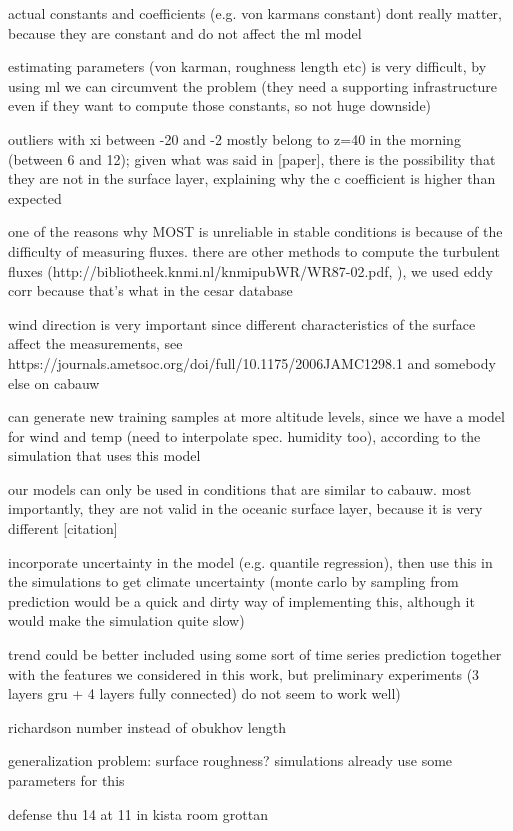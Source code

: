 \documentclass[a4paper]{book}
\begin{document}
actual constants and coefficients (e.g. von karmans constant) dont really matter, because they are constant and do not affect the ml model 

estimating parameters (von karman, roughness length etc) is very difficult, by using ml we can circumvent the problem (they need a supporting infrastructure even if they want to compute those constants, so not huge downside)

outliers with xi between -20 and -2 mostly belong to z=40 in the morning (between 6 and 12); given what was said in [paper], there is the possibility that they are not in the surface layer, explaining why the c coefficient is higher than expected

one of the reasons why MOST is unreliable in stable conditions is because of the difficulty of measuring fluxes. there are other methods to compute the turbulent fluxes (http://bibliotheek.knmi.nl/knmipubWR/WR87-02.pdf, ), we used eddy corr because that's what in the cesar database

wind direction is very important since different characteristics of the surface affect the measurements, see https://journals.ametsoc.org/doi/full/10.1175/2006JAMC1298.1 and somebody else on cabauw

can generate new training samples at more altitude levels, since we have a model for wind and temp (need to interpolate spec. humidity too), according to the simulation that uses this model

our models can only be used in conditions that are similar to cabauw. most importantly, they are not valid in the oceanic surface layer, because it is very different [citation]

incorporate uncertainty in the model (e.g. quantile regression), then use this in the simulations to get climate uncertainty (monte carlo by sampling from prediction would be a quick and dirty way of implementing this, although it would make the simulation quite slow)

trend could be better included using some sort of time series prediction together with the features we considered in this work, but preliminary experiments (3 layers gru + 4 layers fully connected) do not seem to work well)

richardson number instead of obukhov length

generalization problem: surface roughness? simulations already use some parameters for this

defense thu 14 at 11 in kista room grottan
\end{document}
